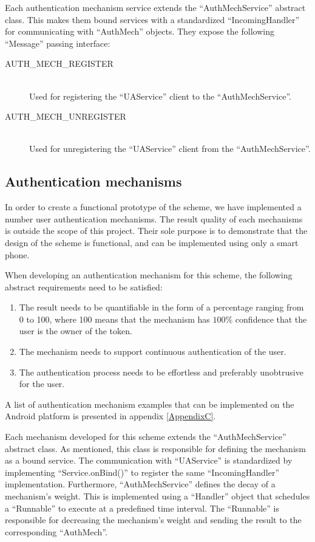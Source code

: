 Each authentication mechanism service extends the ``AuthMechService'' abstract class. This makes them bound services with a standardized ``IncomingHandler'' for communicating with ``AuthMech'' objects. They expose the following ``Message'' passing interface:
\begin{description}
  \item[AUTH\_MECH\_REGISTER] \hfill \\
  Used for registering the ``UAService'' client to the ``AuthMechService''.
  
  \item[AUTH\_MECH\_UNREGISTER] \hfill \\
  Used for unregistering the ``UAService'' client from the ``AuthMechService''.
  \end{description}  
  
\subsection{Authentication mechanisms}
\label{implauthmech}
In order to create a functional prototype of the scheme, we have implemented a number user authentication mechanisms. The result quality of each mechanisms is outside the scope of this project. Their sole purpose is to demonstrate that the design of the scheme is functional, and can be implemented using only a smart phone.

When developing an authentication mechanism for this scheme, the following abstract requirements need to be satisfied: 
\begin{enumerate}
	\item The result needs to be quantifiable in the form of a percentage ranging from 0 to 100, where 100 means that the mechanism has $100\%$ confidence that the user is the owner of the token.
	\item The mechanism needs to support continuous authentication of the user.
	\item The authentication process needs to be effortless and preferably unobtrusive for the user.
\end{enumerate}
A list of authentication mechanism examples that can be implemented on the Android platform is presented in appendix \ref{AppendixC}.

Each mechanism developed for this scheme extends the ``AuthMechService'' abstract class. As mentioned, this class is responsible for defining the mechanism as a bound service. The communication with ``UAService'' is standardized by implementing ``Service.onBind()'' to register the same ``IncomingHandler'' implementation. Furthermore, ``AuthMechService'' defines the decay of a mechanism's weight. This is implemented using a ``Handler'' object that schedules a ``Runnable'' to execute at a predefined time interval. The ``Runnable'' is responsible for decreasing the mechanism's weight and sending the result to the corresponding ``AuthMech''.

